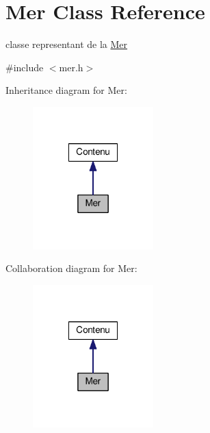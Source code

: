 \hypertarget{classMer}{\section{Mer Class Reference}
\label{classMer}
}


classe representant de la \hyperlink{classMer}{Mer}  




{\ttfamily \#include $<$mer.\+h$>$}



Inheritance diagram for Mer\+:
\nopagebreak
\begin{figure}[H]
\begin{center}
\leavevmode
\includegraphics[width=132pt]{classMer__inherit__graph}
\end{center}
\end{figure}


Collaboration diagram for Mer\+:
\nopagebreak
\begin{figure}[H]
\begin{center}
\leavevmode
\includegraphics[width=132pt]{classMer__coll__graph}
\end{center}
\end{figure}
